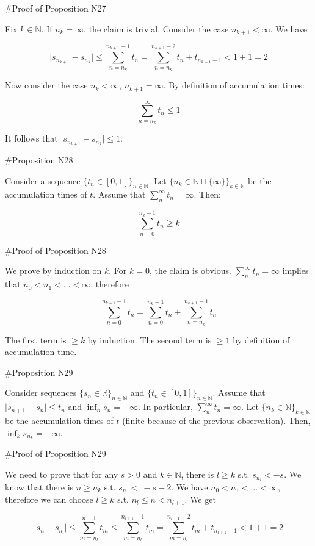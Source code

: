 \documentclass[a4paper]{article}
\newcommand{\Nats}{\mathbb{N}}
\newcommand{\Reals}{\mathbb{R}}
\newcommand{\Abs}[1]{\lvert #1 \rvert}
\begin{document}
\#Proof of Proposition N27

Fix ${k \in \Nats}$. If ${n_k = \infty}$, the claim is trivial. Consider the case ${n_{k+1} < \infty}$. We have

$$\Abs{s_{n_{k+1}}-s_{n_k}} \leq \sum_{n=n_k}^{n_{k+1}-1} t_n = \sum_{n=n_k}^{n_{k+1}-2} t_n + t_{n_{k+1}-1} < 1+1=2$$

Now consider the case ${n_k < \infty}$, ${n_{k+1} = \infty}$. By definition of accumulation times:

$$\sum_{n=n_k}^{\infty} t_n \leq 1$$

It follows that $\Abs{s_{n_{k+1}}-s_{n_k}} \leq 1$.

\#Proposition N28

Consider a sequence ${\{t_n \in [0,1]\}_{n \in \Nats}}$. Let ${\{n_k \in \Nats \sqcup \{\infty\}\}_{k \in \Nats}}$ be the accumulation times of ${t}$. Assume that ${\sum_n^\infty t_n = \infty}$. Then:

$$\sum_{n = 0}^{n_k - 1} t_n \geq k$$

\#Proof of Proposition N28

We prove by induction on ${k}$. For ${k=0}$, the claim is obvious. ${\sum_n^\infty t_n = \infty}$ implies that ${n_0 < n_1 < \ldots < \infty}$, therefore

$$\sum_{n = 0}^{n_{k+1} - 1} t_n = \sum_{n = 0}^{n_{k} - 1} t_n + \sum_{n = n_k}^{n_{k+1} - 1} t_n$$

The first term is ${\geq k}$ by induction. The second term is ${\geq 1}$ by definition of accumulation time.

\#Proposition N29

Consider sequences ${\{s_n \in \Reals\}_{n \in \Nats}}$ and ${\{t_n \in [0,1]\}_{n \in \Nats}}$. Assume that ${\Abs{s_{n+1}-s_n} \leq t_n}$ and ${\inf_n s_n = -\infty}$. In particular, ${\sum_n^\infty t_n = \infty}$. Let ${\{n_k \in \Nats\}_{k \in \Nats}}$ be the accumulation times of ${t}$ (finite because of the previous observation).  Then, ${\inf_k s_{n_k} = -\infty}$.

\#Proof of Proposition N29

We need to prove that for any ${s > 0}$ and ${k \in \Nats}$, there is ${l \geq k}$ s.t. ${s_{n_l} < -s}$. We know that there is ${n \geq n_k}$ s.t. ${s_n\ <\ -s-2}$. We have ${n_0 < n_1 < \ldots < \infty}$, therefore we can choose ${l \geq k}$ s.t. ${n_l \leq n < n_{l+1}}$. We get

$$\Abs{s_n-s_{n_l}} \leq \sum_{m=n_l}^{n - 1} t_m \leq \sum_{m=n_l}^{n_{l+1} - 1} t_m = \sum_{m=n_l}^{n_{l+1} - 2} t_m + t_{n_{l+1}-1} < 1 + 1 =2$$
\end{document}
